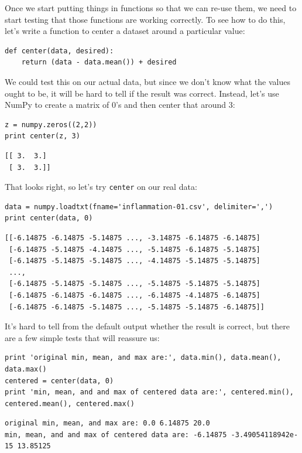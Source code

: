 \documentclass{book}
\begin{document}
Once we start putting things in functions so that we can re-use them, we
need to start testing that those functions are working correctly. To see
how to do this, let's write a function to center a dataset around a
particular value:

\begin{verbatim}
def center(data, desired):
    return (data - data.mean()) + desired
\end{verbatim}

We could test this on our actual data, but since we don't know what the
values ought to be, it will be hard to tell if the result was correct.
Instead, let's use NumPy to create a matrix of 0's and then center that
around 3:

\begin{verbatim}
z = numpy.zeros((2,2))
print center(z, 3)
\end{verbatim}

\begin{verbatim}
[[ 3.  3.]
 [ 3.  3.]]
\end{verbatim}

That looks right, so let's try \texttt{center} on our real data:

\begin{verbatim}
data = numpy.loadtxt(fname='inflammation-01.csv', delimiter=',')
print center(data, 0)
\end{verbatim}

\begin{verbatim}
[[-6.14875 -6.14875 -5.14875 ..., -3.14875 -6.14875 -6.14875]
 [-6.14875 -5.14875 -4.14875 ..., -5.14875 -6.14875 -5.14875]
 [-6.14875 -5.14875 -5.14875 ..., -4.14875 -5.14875 -5.14875]
 ...,
 [-6.14875 -5.14875 -5.14875 ..., -5.14875 -5.14875 -5.14875]
 [-6.14875 -6.14875 -6.14875 ..., -6.14875 -4.14875 -6.14875]
 [-6.14875 -6.14875 -5.14875 ..., -5.14875 -5.14875 -6.14875]]
\end{verbatim}

It's hard to tell from the default output whether the result is correct,
but there are a few simple tests that will reassure us:

\begin{verbatim}
print 'original min, mean, and max are:', data.min(), data.mean(), data.max()
centered = center(data, 0)
print 'min, mean, and and max of centered data are:', centered.min(), centered.mean(), centered.max()
\end{verbatim}

\begin{verbatim}
original min, mean, and max are: 0.0 6.14875 20.0
min, mean, and and max of centered data are: -6.14875 -3.49054118942e-15 13.85125
\end{verbatim}
\end{document}
